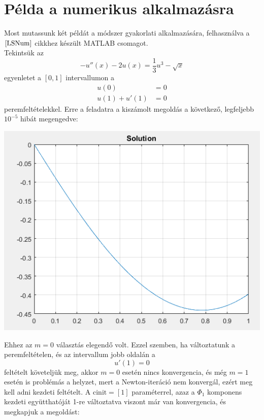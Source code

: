 \documentclass[oneside, titlepage, 12pt, a4paper]{report}
\begin{document}
\section{Példa a numerikus alkalmazásra}
\label{sec:examples}

Most mutassunk két példát a módszer gyakorlati alkalmazására, felhasználva a $\cite{LSNum}$ cikkhez készült MATLAB csomagot. \\
Tekintsük az
\begin{equation*}
-u''(x) - 2u(x) = \frac{1}{3} u^3 - \sqrt{x}
\end{equation*}
egyenletet a $[0, 1]$ intervallumon a
\begin{align*}
u(0) &= 0 \\
u(1) + u'(1) &= 0
\end{align*}
peremfeltételekkel. Erre a feladatra a kiszámolt megoldás a következő, legfeljebb $10^{-5}$ hibát megengedve:
\begin{center}
	\includegraphics{./abrak/pelda_01.png}
\end{center}
Ehhez az $m = 0$ választás elegendő volt. Ezzel szemben, ha változtatunk a peremfeltételen, és az intervallum jobb oldalán a
\begin{equation*}
u'(1) = 0
\end{equation*}
feltételt követeljük meg, akkor $m=0$ esetén nincs konvergencia, és még $m=1$ esetén is problémás a helyzet, mert a Newton-iteráció nem konvergál, ezért meg kell adni kezdeti feltételt. A 
$\text{cinit} = [1]$ paraméterrel, azaz a $\Phi_1$ komponens kezdeti együtthatóját 1-re változtatva viszont már van konvergencia, és megkapjuk a megoldást:
\end{document}

